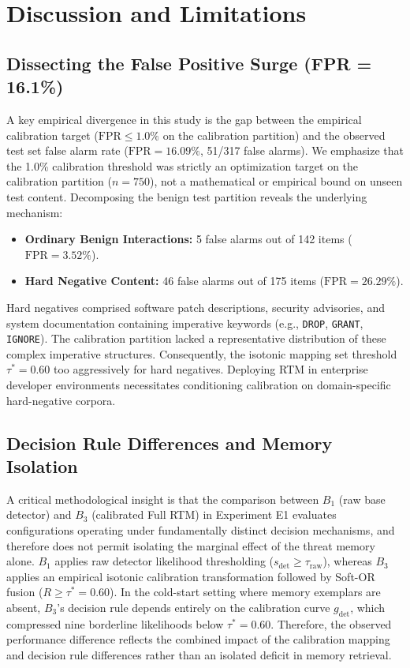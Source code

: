 \documentclass[conference]{IEEEtran}
\begin{document}
\section{Discussion and Limitations}

\subsection{Dissecting the False Positive Surge (FPR = 16.1\%)}
A key empirical divergence in this study is the gap between the empirical calibration target ($\text{FPR} \le 1.0\%$ on the calibration partition) and the observed test set false alarm rate ($\text{FPR} = 16.09\%$, 51/317 false alarms). We emphasize that the 1.0\% calibration threshold was strictly an optimization target on the calibration partition ($n=750$), not a mathematical or empirical bound on unseen test content. Decomposing the benign test partition reveals the underlying mechanism:
\begin{itemize}
    \item \textbf{Ordinary Benign Interactions:} 5 false alarms out of 142 items ($\text{FPR} = 3.52\%$).
    \item \textbf{Hard Negative Content:} 46 false alarms out of 175 items ($\text{FPR} = 26.29\%$).
\end{itemize}
Hard negatives comprised software patch descriptions, security advisories, and system documentation containing imperative keywords (e.g., \texttt{DROP}, \texttt{GRANT}, \texttt{IGNORE}). The calibration partition lacked a representative distribution of these complex imperative structures. Consequently, the isotonic mapping set threshold $\tau^* = 0.60$ too aggressively for hard negatives. Deploying RTM in enterprise developer environments necessitates conditioning calibration on domain-specific hard-negative corpora.

\subsection{Decision Rule Differences and Memory Isolation}
A critical methodological insight is that the comparison between $B_1$ (raw base detector) and $B_3$ (calibrated Full RTM) in Experiment E1 evaluates configurations operating under fundamentally distinct decision mechanisms, and therefore does not permit isolating the marginal effect of the threat memory alone. $B_1$ applies raw detector likelihood thresholding ($s_{\text{det}} \ge \tau_{\text{raw}}$), whereas $B_3$ applies an empirical isotonic calibration transformation followed by Soft-OR fusion ($R \ge \tau^* = 0.60$). In the cold-start setting where memory exemplars are absent, $B_3$'s decision rule depends entirely on the calibration curve $g_{\text{det}}$, which compressed nine borderline likelihoods below $\tau^* = 0.60$. Therefore, the observed performance difference reflects the combined impact of the calibration mapping and decision rule differences rather than an isolated deficit in memory retrieval.
\end{document}
